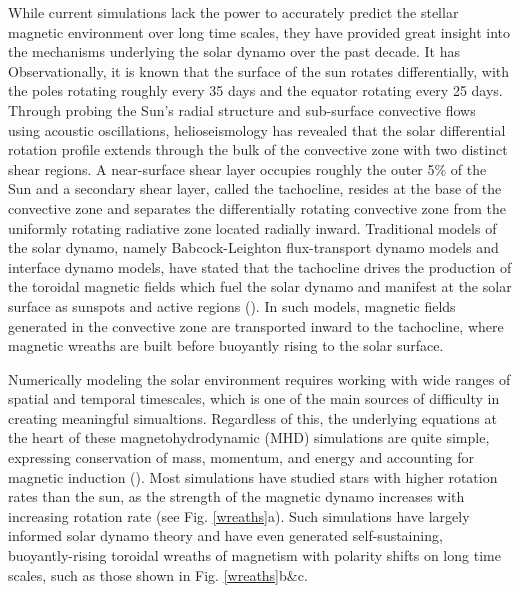 \documentclass[aasms,12pt]{article}
\begin{document}
While current simulations lack the power to accurately 
predict the stellar magnetic environment 
over long time scales, they have provided great insight into the mechanisms
underlying the solar dynamo over the past decade.  
It has 
Observationally, it is known that the surface of the sun rotates differentially,
with the poles rotating roughly every 35 days and the equator rotating every 25
days.
Through probing the Sun's
radial structure and sub-surface convective flows using acoustic oscillations,
helioseismology
has revealed that the solar differential rotation profile extends through the
bulk of the convective zone with two distinct shear regions.  A near-surface
shear layer occupies roughly the outer 5\% of the Sun and a secondary shear
layer, called the tachocline, resides at the base of the convective zone
and separates the differentially rotating convective zone from the uniformly
rotating radiative zone located radially inward.  
Traditional models of the solar dynamo, namely Babcock-Leighton flux-transport
dynamo models and interface dynamo models, have stated that the
tachocline drives the production of the toroidal magnetic   
fields which fuel the solar dynamo and manifest at the solar surface as
sunspots and active regions (\citealt{Toomre2009}).  In such models, 
magnetic fields generated
in the convective zone are transported inward to the tachocline, where
magnetic wreaths are built before buoyantly 
rising to the solar surface.

Numerically modeling the solar environment requires working with wide ranges
of spatial and temporal timescales, which is one of the main sources of
difficulty in creating meaningful simualtions.  Regardless of this, the
underlying equations at the heart of these magnetohydrodynamic (MHD) simulations
are quite simple, expressing conservation of mass, momentum, and energy and
accounting for magnetic induction (\citealt{Charbonneau2014}).  Most simulations
have studied stars with higher rotation rates than the sun, as the strength
of the magnetic dynamo increases with increasing rotation rate (see Fig.
\ref{wreaths}a).  Such simulations
have largely informed solar dynamo theory and have even generated 
self-sustaining, buoyantly-rising toroidal wreaths of magnetism with polarity
shifts on long time scales,
such as those shown in Fig. \ref{wreaths}b\&c.  
\end{document}
